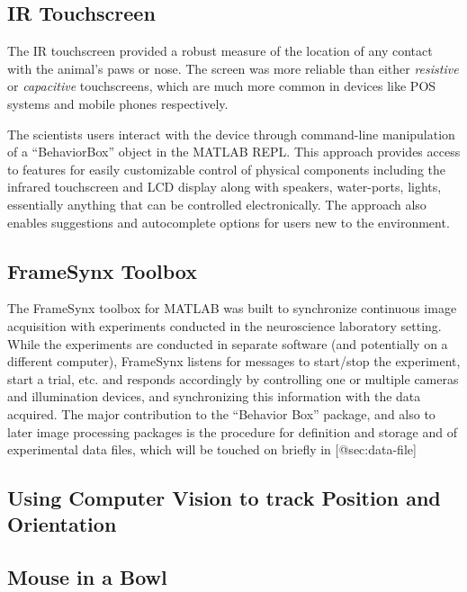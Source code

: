 \subsection{IR Touchscreen}\label{sec:ir-touchscreen}

The IR touchscreen provided a robust measure of the location of any
contact with the animal's paws or nose. The screen was more reliable
than either \emph{resistive} or \emph{capacitive} touchscreens, which
are much more common in devices like POS systems and mobile phones
respectively.

The scientists users interact with the device through command-line manipulation of a
``BehaviorBox'' object in the MATLAB REPL. This approach provides access to
features for easily customizable control of physical components including the
infrared touchscreen and LCD display along with speakers, water-ports,
lights, essentially anything that can be controlled electronically.
The approach also enables suggestions and autocomplete options for users new to the environment.

\subsection{FrameSynx Toolbox}\label{sec:framesynx-toolbox}

The FrameSynx toolbox for MATLAB was built to synchronize continuous
image acquisition with experiments conducted in the neuroscience
laboratory setting. While the experiments are conducted in separate
software (and potentially on a different computer), FrameSynx listens
for messages to start/stop the experiment, start a trial, etc. and
responds accordingly by controlling one or multiple cameras and
illumination devices, and synchronizing this information with the data
acquired. The major contribution to the ``Behavior Box'' package, and
also to later image processing packages is the procedure for definition
and storage and of experimental data files, which will be touched on
briefly in {[}@sec:data-file{]}

\subsection{Using Computer Vision to track Position and
Orientation}\label{sec:using-computer-vision-to-track-position-and-orientation}

\subsection{Mouse in a Bowl}\label{mouse-in-a-bowl}

